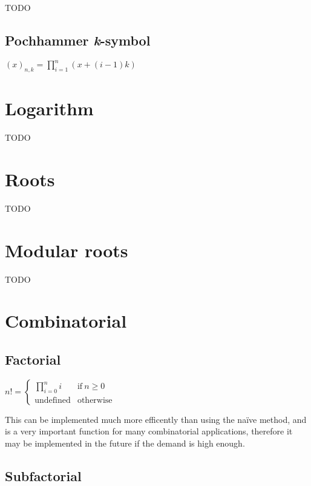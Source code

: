 TODO


\subsection{Pochhammer \emph{k}-symbol}
\label{sec:Pochhammer k-symbol}

\( \displaystyle{
    (x)_{n,k} = \prod_{i = 1}^n (x + (i - 1)k)
}\)


\newpage
\section{Logarithm}
\label{sec:Logarithm}

TODO


\newpage
\section{Roots}
\label{sec:Roots}

TODO


\newpage
\section{Modular roots}
\label{sec:Modular roots}

TODO %


\newpage
\section{Combinatorial}
\label{sec:Combinatorial}

\subsection{Factorial}
\label{sec:Factorial}

\( \displaystyle{
    n! = \left \lbrace \begin{array}{ll}
        \displaystyle{\prod_{i = 0}^n i} & \textrm{if}~ n \ge 0 \\
        \textrm{undefined} & \textrm{otherwise}
    \end{array} \right .
}\)
\vspace{1em}

This can be implemented much more efficently
than using the naïve method, and is a very
important function for many combinatorial
applications, therefore it may be implemented
in the future if the demand is high enough.


\subsection{Subfactorial}
\label{sec:Subfactorial}

